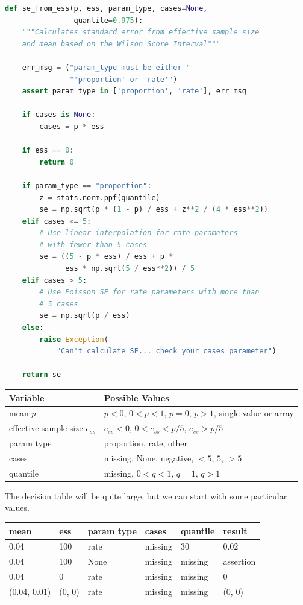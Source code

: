 \documentclass[fleqn,10pt]{olplainarticle}
\begin{document}
\begin{lstlisting}[language=Python]
def se_from_ess(p, ess, param_type, cases=None,
                quantile=0.975):
    """Calculates standard error from effective sample size
    and mean based on the Wilson Score Interval"""

    err_msg = ("param_type must be either "
               "'proportion' or 'rate'")
    assert param_type in ['proportion', 'rate'], err_msg

    if cases is None:
        cases = p * ess

    if ess == 0:
        return 0

    if param_type == "proportion":
        z = stats.norm.ppf(quantile)
        se = np.sqrt(p * (1 - p) / ess + z**2 / (4 * ess**2))
    elif cases <= 5:
        # Use linear interpolation for rate parameters
        # with fewer than 5 cases
        se = ((5 - p * ess) / ess + p *
              ess * np.sqrt(5 / ess**2)) / 5
    elif cases > 5:
        # Use Poisson SE for rate parameters with more than
        # 5 cases
        se = np.sqrt(p / ess)
    else:
        raise Exception(
            "Can't calculate SE... check your cases parameter")

    return se
\end{lstlisting}

\begin{center}
    \begin{tabular}{ll}
    \hline
    Variable & Possible Values \\ \hline
    mean $p$ & $p<0$, $0<p<1$, $p=0$, $p>1$, single value or array \\
    effective sample size $e_{ss}$ & $e_{ss} <0$, $0<e_{ss}<p/5$, $e_{ss}>p/5$ \\
    param type & proportion, rate, other \\
    cases & missing, None, negative, $<5$, $5$, $>5$ \\
    quantile & missing, $0<q<1$, $q=1$, $q>1$ \\ \hline
    \end{tabular}
\end{center}
The decision table will be quite large, but we can start with some
particular values.
\begin{center}
    \begin{tabular}{llllll}
    \hline
    mean & ess & param type & cases & quantile & result \\ \hline
    0.04 & 100 & rate & missing & 30 & $0.02$ \\
    0.04 & 100 & None & missing & missing & assertion \\
    0.04 & 0 & rate & missing & missing & 0 \\
    (0.04, 0.01) & (0, 0) & rate & missing & missing & (0, 0)
\end{tabular}
\end{center}
\end{document}
